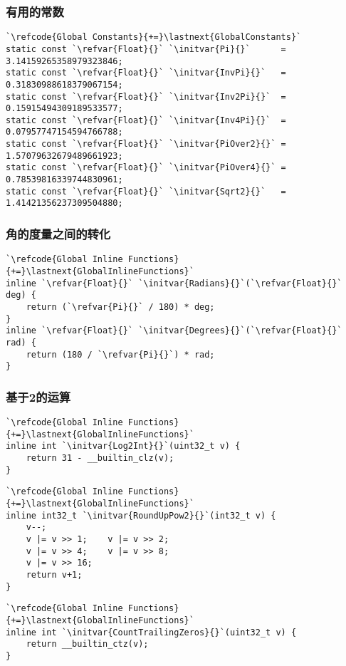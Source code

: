 \subsubsection*{有用的常数}
\begin{lstlisting}
`\refcode{Global Constants}{+=}\lastnext{GlobalConstants}`
static const `\refvar{Float}{}` `\initvar{Pi}{}`      = 3.14159265358979323846;
static const `\refvar{Float}{}` `\initvar{InvPi}{}`   = 0.31830988618379067154;
static const `\refvar{Float}{}` `\initvar{Inv2Pi}{}`  = 0.15915494309189533577;
static const `\refvar{Float}{}` `\initvar{Inv4Pi}{}`  = 0.07957747154594766788;
static const `\refvar{Float}{}` `\initvar{PiOver2}{}` = 1.57079632679489661923;
static const `\refvar{Float}{}` `\initvar{PiOver4}{}` = 0.78539816339744830961;
static const `\refvar{Float}{}` `\initvar{Sqrt2}{}`   = 1.41421356237309504880;
\end{lstlisting}

\subsubsection*{角的度量之间的转化}
\begin{lstlisting}
`\refcode{Global Inline Functions}{+=}\lastnext{GlobalInlineFunctions}`
inline `\refvar{Float}{}` `\initvar{Radians}{}`(`\refvar{Float}{}` deg) { 
    return (`\refvar{Pi}{}` / 180) * deg; 
}
inline `\refvar{Float}{}` `\initvar{Degrees}{}`(`\refvar{Float}{}` rad) { 
    return (180 / `\refvar{Pi}{}`) * rad; 
}
\end{lstlisting}

\subsubsection*{基于2的运算}
\begin{lstlisting}
`\refcode{Global Inline Functions}{+=}\lastnext{GlobalInlineFunctions}`
inline int `\initvar{Log2Int}{}`(uint32_t v) {
    return 31 - __builtin_clz(v);
}
\end{lstlisting}
\begin{lstlisting}
`\refcode{Global Inline Functions}{+=}\lastnext{GlobalInlineFunctions}`
inline int32_t `\initvar{RoundUpPow2}{}`(int32_t v) {
    v--;
    v |= v >> 1;    v |= v >> 2;
    v |= v >> 4;    v |= v >> 8;
    v |= v >> 16;
    return v+1;
}
\end{lstlisting}
\begin{lstlisting}
`\refcode{Global Inline Functions}{+=}\lastnext{GlobalInlineFunctions}`
inline int `\initvar{CountTrailingZeros}{}`(uint32_t v) {
    return __builtin_ctz(v);
}
\end{lstlisting}

